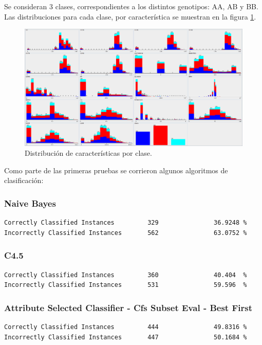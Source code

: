 \documentclass[11pt,a4paper]{article}
\begin{document}
Se consideran 3 clases, correspondientes a los distintos genotipos: AA, AB y BB.\\

Las distribuciones para cada clase, por característica se muestran en la figura \ref{fig:caracteristicas}.

\begin{figure}
	\includegraphics[width=1\textwidth]{./pics/caracteristicas.png}
	\caption{Distribución de características por clase.}
	\label{fig:caracteristicas}
\end{figure}

Como parte de las primeras pruebas se corrieron algunos algoritmos de clasificación:
\subsubsection*{Naive Bayes}
\begin{verbatim}
Correctly Classified Instances         329               36.9248 %
Incorrectly Classified Instances       562               63.0752 %
\end{verbatim}

\subsubsection*{C4.5}
\begin{verbatim}
Correctly Classified Instances         360               40.404  %
Incorrectly Classified Instances       531               59.596  %
\end{verbatim}

\subsubsection*{Attribute Selected Classifier - Cfs Subset Eval - Best First}
\begin{verbatim}
Correctly Classified Instances         444               49.8316 %
Incorrectly Classified Instances       447               50.1684 %
\end{verbatim}
\end{document}
